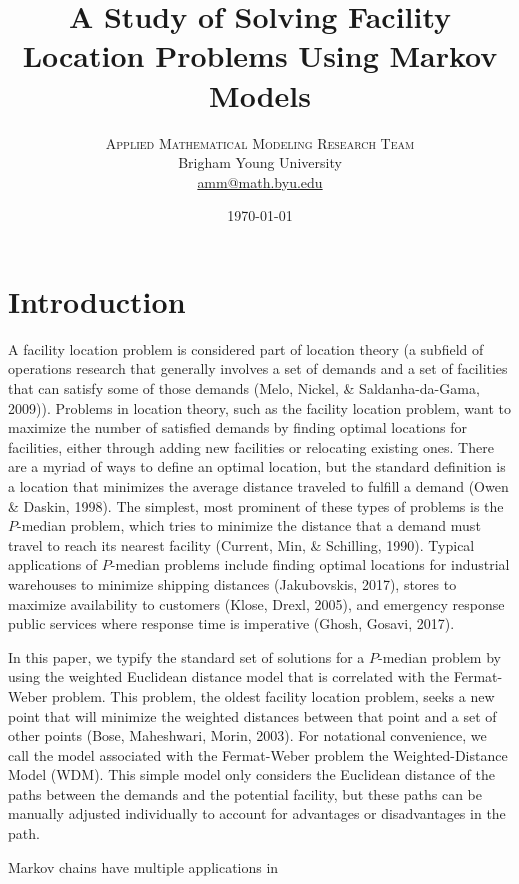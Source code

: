 \documentclass[twoside,twocolumn]{article}
\title{A Study of Solving Facility Location Problems Using Markov Models}
\author{
\textsc{Applied Mathematical Modeling Research Team}\\[1ex]
\normalsize Brigham Young University \\
\normalsize \href{mailto:amm@math.byu.edu}{amm@math.byu.edu}
}
\date{\today}
\begin{document}
\maketitle

\section{Introduction}

A facility location problem is considered part of location theory (a subfield of operations research that generally involves a set of demands and a set of facilities that can satisfy some of those demands (Melo, Nickel, \& Saldanha-da-Gama, 2009)).
Problems in location theory, such as the facility location problem, want to maximize the number of satisfied demands by finding optimal locations for facilities, either through adding new facilities or relocating existing ones.
There are a myriad of ways to define an optimal location, but the standard definition is a location that minimizes the average distance traveled to fulfill a demand (Owen \& Daskin, 1998).
The simplest, most prominent of these types of problems is the $P$-median problem, which tries to minimize the distance that a demand must travel to reach its nearest facility (Current, Min, \& Schilling, 1990). Typical applications of $P$-median problems include finding optimal locations for industrial warehouses to minimize shipping distances (Jakubovskis, 2017), stores to maximize availability to customers (Klose, Drexl, 2005), and emergency response public services where response time is imperative (Ghosh, Gosavi, 2017).

In this paper, we typify the standard set of solutions for a $P$-median problem by using the weighted Euclidean distance model that is correlated with the Fermat-Weber problem.
This problem, the oldest facility location problem, seeks a new point that will minimize the weighted distances between that point and a set of other points (Bose, Maheshwari, Morin, 2003).
For notational convenience, we call the model associated with the Fermat-Weber problem the Weighted-Distance Model (WDM).
This simple model only considers the Euclidean distance of the paths between the demands and the potential facility, but these paths can be manually adjusted individually to account for advantages or disadvantages in the path.



Markov chains have multiple applications in
\end{document}
